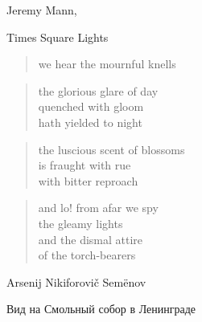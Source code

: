 \begin{volumetitlepage}
	\bigskip\bigskip\bigskip
\end{volumetitlepage}


\begin{artItem}
	Jeremy Mann, \begin{otherlanguage}{english}%
		Times Square Lights%
	\end{otherlanguage}
\end{artItem}

	\begin{otherlanguage}{english}
		\begin{verse}
			we hear the mournful knells
		\end{verse}

		\begin{verse}
			the glorious glare of day\\
			quenched with gloom\\
			hath yielded to night
		\end{verse}

		\begin{verse}
			the luscious scent of blossoms\\
			is fraught with rue\\
			with bitter reproach
		\end{verse}

		\begin{verse}
			and lo! from afar we spy\\
			the gleamy lights\\
			and the dismal attire\\
			of the torch-bearers
		\end{verse}
\end{otherlanguage}

\clearpage


\begin{artItem}
	Arsenij Nikiforovič Semënov \begin{otherlanguage}{russian}%
		Вид на Смольный собор в Ленинграде%
	\end{otherlanguage}
\end{artItem}

